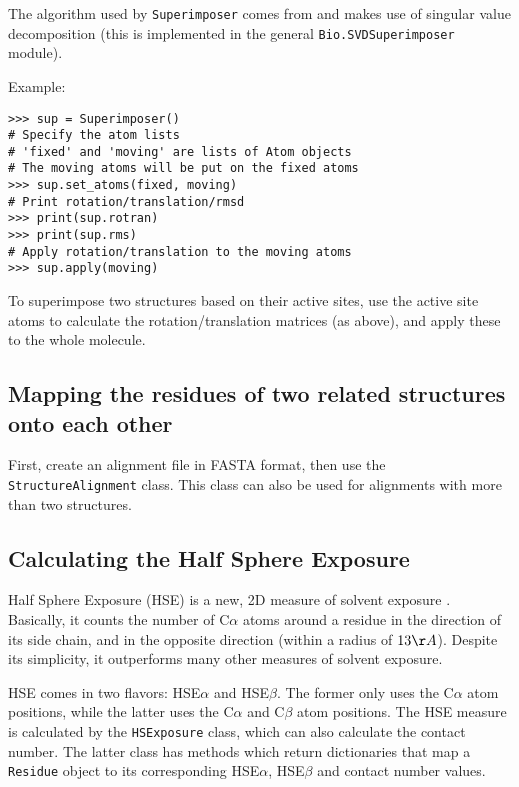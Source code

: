 The algorithm used by \texttt{Superimposer} comes from \cite[Golub \& Van Loan]{golub1989} and makes use of singular value decomposition (this is implemented in the general \texttt{Bio.SVDSuperimposer} module).

Example:

\begin{verbatim}
>>> sup = Superimposer()
# Specify the atom lists
# 'fixed' and 'moving' are lists of Atom objects
# The moving atoms will be put on the fixed atoms
>>> sup.set_atoms(fixed, moving)
# Print rotation/translation/rmsd
>>> print(sup.rotran)
>>> print(sup.rms)
# Apply rotation/translation to the moving atoms
>>> sup.apply(moving)
\end{verbatim}

To superimpose two structures based on their active sites, use the active site atoms to calculate the rotation/translation matrices (as above), and apply these to the whole molecule.

\subsection{Mapping the residues of two related structures onto each other}

First, create an alignment file in FASTA format, then use the \texttt{StructureAlignment}
class. This class can also be used for alignments with more than two
structures.

\subsection{Calculating the Half Sphere Exposure}

Half Sphere Exposure (HSE) is a new, 2D measure of solvent exposure
\cite{hamelryck2005}.
Basically, it counts the number of C$\alpha$ atoms around a residue
in the direction of its side chain, and in the opposite direction
(within a radius of $13 \AA$). Despite its simplicity, it outperforms
many other measures of solvent exposure.

HSE comes in two flavors: HSE$\alpha$ and HSE$\beta$. The former
only uses the C$\alpha$ atom positions, while the latter uses the
C$\alpha$ and C$\beta$ atom positions. The HSE measure is calculated
by the \texttt{HSExposure} class, which can also calculate the contact
number. The latter class has methods which return dictionaries that
map a \texttt{Residue} object to its corresponding HSE$\alpha$, HSE$\beta$
and contact number values.

